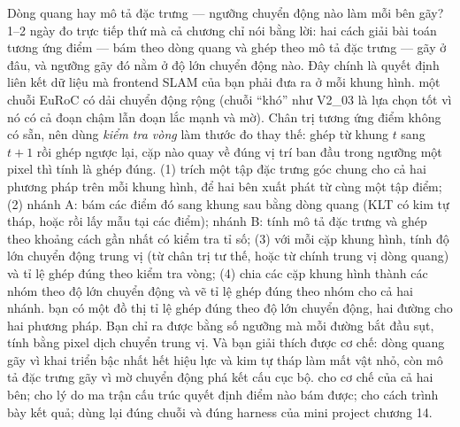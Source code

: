 \documentclass[../../deep_learning.tex]{subfiles}
\begin{document}
\begin{duan}{Dòng quang hay mô tả đặc trưng --- ngưỡng chuyển động nào làm mỗi bên gãy?}{1--2 ngày}
\dmt đo trực tiếp thứ mà cả chương chỉ nói bằng lời: hai cách giải bài toán tương ứng điểm --- bám theo dòng quang và ghép theo mô tả đặc trưng --- gãy ở đâu, và ngưỡng gãy đó nằm ở độ lớn chuyển động nào. Đây chính là quyết định liên kết dữ liệu mà frontend SLAM của bạn phải đưa ra ở mỗi khung hình.
\ddl một chuỗi EuRoC có dải chuyển động rộng (chuỗi ``khó'' như V2\_03 là lựa chọn tốt vì nó có cả đoạn chậm lẫn đoạn lắc mạnh và mờ). Chân trị tương ứng điểm không có sẵn, nên dùng \emph{kiểm tra vòng} làm thước đo thay thế: ghép từ khung \(t\) sang \(t+1\) rồi ghép ngược lại, cặp nào quay về đúng vị trí ban đầu trong ngưỡng một pixel thì tính là ghép đúng.
\dbc (1) trích một tập đặc trưng góc chung cho cả hai phương pháp trên mỗi khung hình, để hai bên xuất phát từ cùng một tập điểm; (2) nhánh A: bám các điểm đó sang khung sau bằng dòng quang (KLT có kim tự tháp, hoặc  rồi lấy mẫu tại các điểm); nhánh B: tính mô tả đặc trưng và ghép theo khoảng cách gần nhất có kiểm tra tỉ số; (3) với mỗi cặp khung hình, tính độ lớn chuyển động trung vị (từ chân trị tư thế, hoặc từ chính trung vị dòng quang) và tỉ lệ ghép đúng theo kiểm tra vòng; (4) chia các cặp khung hình thành các nhóm theo độ lớn chuyển động và vẽ tỉ lệ ghép đúng theo nhóm cho cả hai nhánh.
\dxk bạn có một đồ thị tỉ lệ ghép đúng theo độ lớn chuyển động, hai đường cho hai phương pháp. Bạn chỉ ra được bằng số ngưỡng mà mỗi đường bắt đầu sụt, tính bằng pixel dịch chuyển trung vị. Và bạn giải thích được cơ chế: dòng quang gãy vì khai triển bậc nhất hết hiệu lực và kim tự tháp làm mất vật nhỏ, còn mô tả đặc trưng gãy vì mờ chuyển động phá kết cấu cục bộ.
\dnv {} cho cơ chế của cả hai bên;  cho lý do ma trận cấu trúc quyết định điểm nào bám được;  cho cách trình bày kết quả; dùng lại đúng chuỗi và đúng harness của mini project chương 14.
\end{duan}
\end{document}
